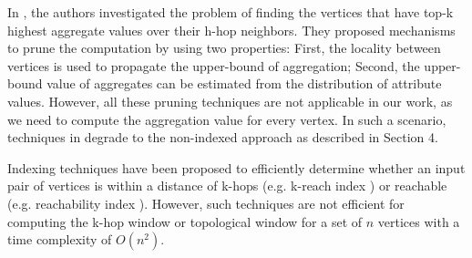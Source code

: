 {In \cite{yan2010top}, the authors investigated the problem of finding the vertices that have top-k highest aggregate values over their h-hop neighbors. They proposed mechanisms to prune the computation by using two properties: First, the locality between vertices is used to propagate the upper-bound of aggregation; Second, the upper-bound value of aggregates can be estimated from the distribution of attribute values. However, all these pruning techniques are not applicable in our work, as we need to compute the aggregation value for every vertex. In such a scenario, techniques in \cite{yan2010top} degrade to the non-indexed approach as described in Section 4.


Indexing techniques have been proposed to efficiently determine whether an input pair of vertices is within a distance of k-hops (e.g. k-reach index \cite{cheng2012k}) or reachable (e.g. reachability index \cite{yu2010graph}). However, such techniques are not efficient for computing the k-hop window or topological window for a set of $n$ vertices with a time complexity of $O(n^2)$. 





}
